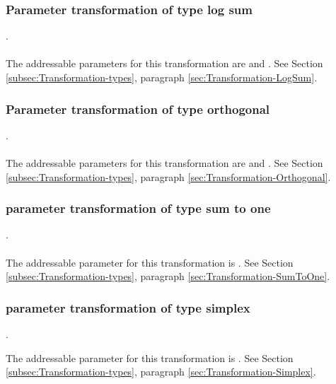 \subsubsection{Parameter transformation of type log sum}
.
\label{syntax:Transformation-LogSum} \\ \\
The addressable parameters for this transformation are  and . See Section \ref{subsec:Transformation-types}, paragraph \ref{sec:Transformation-LogSum}.

\subsubsection{Parameter transformation of type orthogonal}
.
\label{syntax:Transformation-Orthogonal} \\ \\
The addressable parameters for this transformation are  and . See Section \ref{subsec:Transformation-types}, paragraph \ref{sec:Transformation-Orthogonal}.

\subsubsection{parameter transformation of type sum to one}
.
\label{syntax:Transformation-SumToOne} \\ \\
The addressable parameter for this transformation is . See Section \ref{subsec:Transformation-types}, paragraph \ref{sec:Transformation-SumToOne}.

\subsubsection{parameter transformation of type simplex}
.
\label{syntax:Transformation-Simplex}


The addressable parameter for this transformation is . See Section \ref{subsec:Transformation-types}, paragraph \ref{sec:Transformation-Simplex}.


